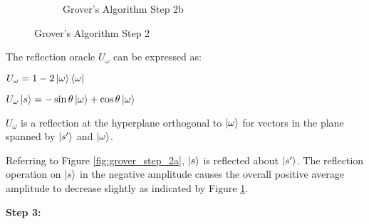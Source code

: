 \documentclass{article}
\begin{document}
\begin{figure}[h]
\begin{subfigure}{0.5\textwidth}
      
      \caption{\label{fig:grover_step_2b} Grover's Algorithm Step 2b}
  \end{subfigure}
  \caption{\label{fig:grover_step_2} Grover's Algorithm Step 2}
\end{figure}

\pagebreak

The reflection oracle $U_\omega$ can be expressed as:
\vspace{5mm}

\qquad $U_\omega = 1 - 2\ket{\omega}\bra{\omega}$
\vspace{5mm}

\qquad $U_\omega \ket{s} = -\sin\theta\ket{\omega} +  \cos\theta\ket{\omega} $ 
\vspace{5mm}

\noindent
$U_{{\omega }}$ is a reflection at the hyperplane orthogonal to $\ket{\omega}$  for vectors in the plane spanned by $\ket{s'}$  and $\ket{\omega}$\cite{noauthor_grovers_2022}.
\vspace{5mm}

\noindent
Referring to Figure \ref{fig:grover_step_2a}, $\ket{s}$ is reflected about $\ket{s'}$. The reflection operation on $\ket{s}$ in the negative amplitude causes the overall positive average amplitude to decrease slightly as indicated by Figure \ref{fig:grover_step_2b}. 
\vspace{5mm}

\textbf{Step 3:}
\vspace{5mm}
\end{document}
